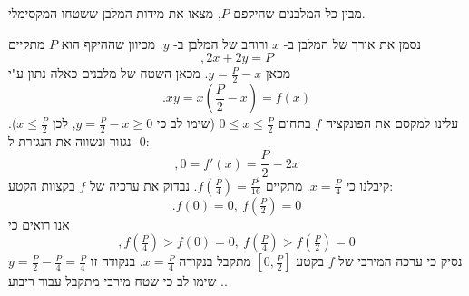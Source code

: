 מבין כל המלבנים שהיקפם \(P\), מצאו את מידות המלבן ששטחו המקסימלי.
\begin{solbox}
נסמן את אורך של המלבן ב-
$x$
ורוחב של המלבן ב-
$y$.
מכיוון שההיקף הוא
$P$
מתקיים
$$,2x+2y=P$$
מכאן
$y=\frac{P}{2}-x$.
מכאן השטח של מלבנים כאלה נתון ע"י
$$.xy=x\left(\frac{P}{2}-x\right)=f(x)$$
עלינו למקסם את הפונקציה
$f$
בתחום
$0\leq x\leq\frac{P}{2}$
(שימו לב כי
$y=\frac{P}{2}-x\geq0$,
לכן
$x\leq\frac{P}{2}$).
נגזור ונשווה את הנגזרת ל-
$0$:
$$,0=f'(x)=\frac{P}{2}-2x$$
קיבלנו כי
$x=\frac{P}{4}$.
מתקיים
$f(\tfrac{P}{4})=\frac{P^2}{16}$.
נבדוק את ערכיה של
$f$
בקצוות הקטע:
$$.f(0)=0,\ f(\tfrac{P}{2})=0$$
אנו רואים כי
$$,f(\tfrac{P}{4})>f(0)=0,\ f(\tfrac{P}{4})>f(\tfrac{P}{2})=0$$
נסיק כי ערכה המירבי של
$f$
בקטע
$[0,\tfrac{P}{2}]$
מתקבל בנקודה
$x=\frac{P}{4}$.
בנקודה זו
$y=\frac{P}{2}-\frac{P}{4}=\frac{P}{4}$.
שימו לב כי שטח מירבי מתקבל עבור ריבוע.
\end{solbox}
